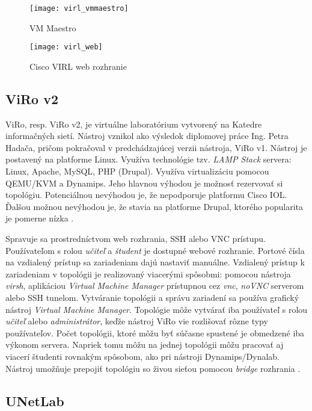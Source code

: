 \begin{figure}
    \centering
    \texttt{[image: virl\_vmmaestro]}
    \caption{VM Maestro} \cite{obr_virl_vmmaestro}
    \label{obr:virl_vmmaestro}
\end{figure}

\begin{figure}
    \centering
    \texttt{[image: virl\_web]}
    \caption{Cisco VIRL web rozhranie} \cite{obr_virl_web}
    \label{obr:virl_web}
\end{figure}

\subsection{ViRo v2}

ViRo, resp. ViRo v2, je virtuálne laboratórium vytvorený na Katedre informačných sietí. Nástroj vznikol ako výsledok diplomovej práce Ing. Petra Hadača, pričom pokračoval v predchádzajúcej verzii nástroja, ViRo v1. Nástroj je postavený na platforme Linux. Využíva technológie tzv. \emph{LAMP Stack} servera: Linux, Apache, MySQL, PHP (Drupal). Využíva virtualizáciu pomocou QEMU/KVM a Dynamips. Jeho hlavnou výhodou je možnosť rezervovať si topológiu. Potenciálnou nevýhodou je, že nepodporuje platformu Cisco IOL. Ďalšou možnou nevýhodou je, že stavia na platforme Drupal, ktorého popularita je pomerne nízka \cite{stackoverflow_survey}.

Spravuje sa prostredníctvom web rozhrania, SSH alebo VNC prístupu. Používateľom s rolou \emph{učiteľ} a \emph{študent} je dostupné webové rozhranie. Portové čísla na vzdialený prístup sa zariadeniam dajú nastaviť manuálne. Vzdialený prístup k zariadeniam v topológii je realizovaný viacerými spôsobmi: pomocou nástroja \emph{virsh}, aplikáciou \emph{Virtual Machine Manager} prístupnou cez \emph{vnc}, \emph{noVNC} serverom alebo SSH tunelom. Vytváranie topológii a správu zariadení sa používa grafický nástroj \emph{Virtual Machine Manager}. Topológie môže vytvárať iba používateľ s rolou  \emph{učiteľ} alebo \emph{administrátor}, keďže nástroj ViRo vie rozlišovať rôzne typy používateľov. Počet topológii, ktoré môžu byť súčasne spustené je obmedzené iba výkonom servera. Napriek tomu môžu na jednej topológii môžu pracovať aj viacerí študenti rovnakým spôsobom, ako pri nástroji Dynamips/Dynalab. Nástroj umožňuje prepojiť topológiu so živou sieťou pomocou \emph{bridge} rozhrania \cite{viro_hadac}.

\subsection{UNetLab}

